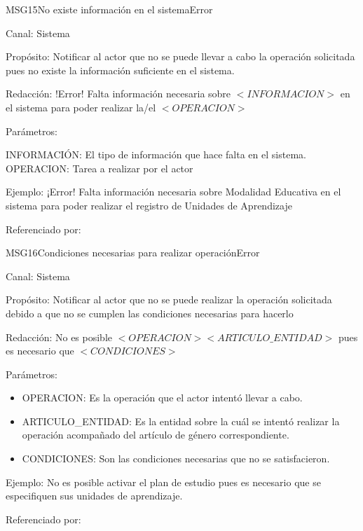 \begin{mensaje}{MSG15}{No existe información en el sistema}{Error}
	\item[Canal:] Sistema
	\item[Propósito:] Notificar al actor que no se puede llevar a cabo la operación solicitada pues no existe la información suficiente en el sistema.
	\item[Redacción:] !Error! Falta información necesaria sobre $<INFORMACION>$ en el sistema para poder realizar la/el $<OPERACION>$ \\
	\item[Parámetros:] 
	\begin{Titemize}
		\Titem INFORMACIÓN: El tipo de información que hace falta en el sistema.
		\Titem OPERACION: Tarea a realizar por el actor
	\end{Titemize}
	\item[Ejemplo:] ¡Error! Falta información necesaria sobre Modalidad Educativa en el sistema para poder realizar el registro de Unidades de Aprendizaje
	\item[Referenciado por: ] 
\end{mensaje}

\begin{mensaje}{MSG16}{Condiciones necesarias para realizar operación}{Error}
	\item[Canal:] Sistema
	\item[Propósito:] Notificar al actor que no se puede realizar la operación solicitada debido a que no se cumplen las condiciones necesarias para hacerlo
	\item[Redacción:] No es posible $<OPERACION> <ARTICULO\_ENTIDAD>$ pues es necesario que $<CONDICIONES>$
	\item[Parámetros:] 
	\begin{itemize}
		\item OPERACION: Es la operación que el actor intentó llevar a cabo.
		\item ARTICULO\_ENTIDAD: Es la entidad sobre la cuál se intentó realizar la operación acompañado del artículo de género correspondiente.
		\item CONDICIONES: Son las condiciones necesarias que no se satisfacieron.
	\end{itemize}
	\item[Ejemplo:] No es posible activar el plan de estudio pues es necesario que se especifiquen sus unidades de aprendizaje.
	\item[Referenciado por: ] 
	
\end{mensaje}

